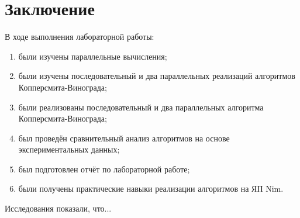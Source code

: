 \documentclass[12pt]{report}
\begin{document}
\chapter*{Заключение}
В ходе выполнения лабораторной работы:
\begin{enumerate}
\item были изучены параллельные вычисления;
\item были изучены последовательный и два параллельных реализаций алгоритмов Копперсмита-Винограда;
\item были реализованы последовательный и два параллельных алгоритма Копперсмита-Винограда;
\item был проведён сравнительный анализ алгоритмов на основе экспериментальных данных;
\item был подготовлен отчёт по лабораторной работе;
\item были получены практические навыки реализации алгоритмов на ЯП Nim.
\end{enumerate}

Исследования показали, что...

\end{document}
